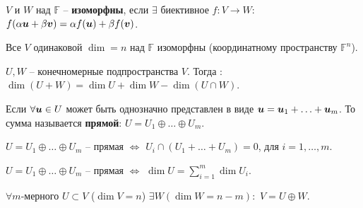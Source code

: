 \begin{to_def}
	$V$ и $W$ над $\mathbb{F}$ -- \textbf{изоморфны}, если  $\exists$ биективное $f \colon V \to W:$ $f(\alpha \mbox{\boldmath $u$} + \beta \mbox{\boldmath $v$}) = \alpha f(\mbox{\boldmath $u$}) + \beta f(\mbox{\boldmath $v$})$.
\end{to_def}

\begin{to_thr}
	Все $V$ одинаковой $\dim = n$ над $\mathbb{F}$ изоморфны (координатному пространству $\mathbb{F}^n$).
\end{to_thr}

\begin{to_thr}
	$U, W$ -- конечномерные подпространства $V$. Тогда : $\dim(U + W) = \dim U + \dim W - \dim(U \cap W)$.
\end{to_thr}

\begin{to_def}
	Если $\forall \mbox{\boldmath $u$} \in U$ может быть однозначно представлен в виде $\mbox{\boldmath $u$} = \mbox{\boldmath $u$}_1 + \ldots + \mbox{\boldmath $u$}_m$. То сумма называется \textbf{прямой}: $U = U_1 \oplus \ldots \oplus U_m$.
\end{to_def}

\begin{to_thr}
	$U = U_1 \oplus \ldots \oplus U_m$ -- прямая $\Longleftrightarrow$ $U_i \cap (U_1 + \ldots + U_m) = 0$, для  $i=1, \ldots, m$.
\end{to_thr}

\begin{to_thr}
	$U = U_1 \oplus \ldots \oplus U_m$ -- прямая $\Longleftrightarrow$ $\dim U = \sum\limits_{ i=1 }^{ m } \dim U_i$.
\end{to_thr}

\begin{to_thr}
	$\forall m$-мерного $U \subset V$ ($\dim V = n$) $\exists W (\dim W = n-m):$ $V = U \oplus W$.
\end{to_thr}